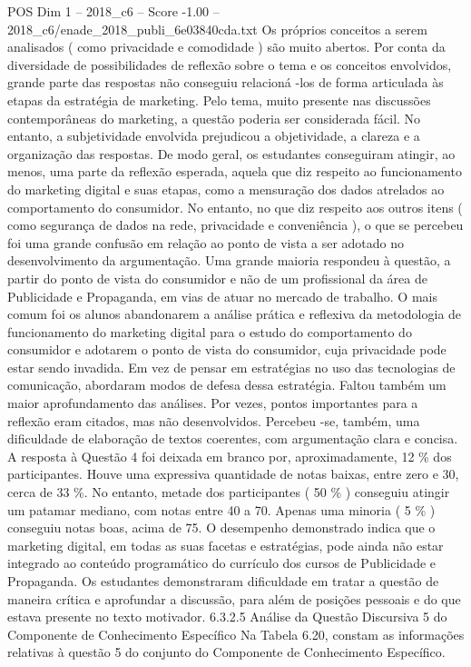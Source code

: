 \begin{textsample}{POS Dim 1 – 2018\_c6 – Score -1.00 – 2018\_c6/enade\_2018\_publi\_6e03840cda.txt}
Os próprios conceitos a serem analisados ( como privacidade e comodidade ) são muito abertos.
Por conta da diversidade de possibilidades de reflexão sobre o tema e os conceitos envolvidos, grande parte das respostas não conseguiu relacioná -los de forma articulada às etapas da estratégia de marketing.
Pelo tema, muito presente nas discussões contemporâneas do marketing, a questão poderia ser considerada fácil.
No entanto, a subjetividade envolvida prejudicou a objetividade, a clareza e a organização das respostas.
De modo geral, os estudantes conseguiram atingir, ao menos, uma parte da reflexão esperada, aquela que diz respeito ao funcionamento do marketing digital e suas etapas, como a mensuração dos dados atrelados ao comportamento do consumidor.
No entanto, no que diz respeito aos outros itens ( como segurança de dados na rede, privacidade e conveniência ), o que se percebeu foi uma grande confusão em relação ao ponto de vista a ser adotado no desenvolvimento da argumentação.
Uma grande maioria respondeu à questão, a partir do ponto de vista do consumidor e não de um profissional da área de Publicidade e Propaganda, em vias de atuar no mercado de trabalho.
O mais comum foi os alunos abandonarem a análise prática e reflexiva da metodologia de funcionamento do marketing digital para o estudo do comportamento do consumidor e adotarem o ponto de vista do consumidor, cuja privacidade pode estar sendo invadida.
Em vez de pensar em estratégias no uso das tecnologias de comunicação, abordaram modos de defesa dessa estratégia.
Faltou também um maior aprofundamento das análises.
Por vezes, pontos importantes para a reflexão eram citados, mas não desenvolvidos.
Percebeu -se, também, uma dificuldade de elaboração de textos coerentes, com argumentação clara e concisa.
A resposta à Questão 4 foi deixada em branco por, aproximadamente, 12 \% dos participantes.
Houve uma expressiva quantidade de notas baixas, entre zero e 30, cerca de 33 \%.
No entanto, metade dos participantes ( 50 \% ) conseguiu atingir um patamar mediano, com notas entre 40 a 70.
Apenas uma minoria ( 5 \% ) conseguiu notas boas, acima de 75.
O desempenho demonstrado indica que o marketing digital, em todas as suas facetas e estratégias, pode ainda não estar integrado ao conteúdo programático do currículo dos cursos de Publicidade e Propaganda.
Os estudantes demonstraram dificuldade em tratar a questão de maneira crítica e aprofundar a discussão, para além de posições pessoais e do que estava presente no texto motivador. 6.3.2.5 Análise da Questão Discursiva 5 do Componente de Conhecimento Específico Na Tabela 6.20, constam as informações relativas à questão 5 do conjunto do Componente de Conhecimento Específico.

\end{textsample}
